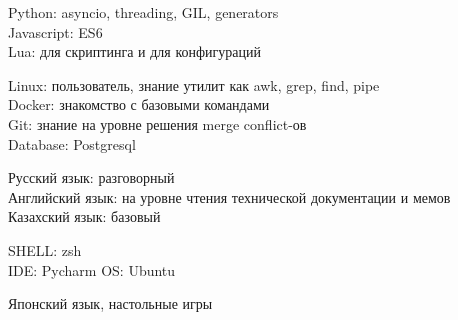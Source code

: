\documentclass[10pt]{article} %
\begin{document}
{
  Python: asyncio, threading, GIL, generators\\
  Javascript: ES6\\
  Lua: для скриптинга и для конфигураций
}

{
  Linux: пользователь, знание утилит как awk, grep, find, pipe\\
  Docker: знакомство с базовыми командами\\
  Git: знание на уровне решения merge conflict-ов\\
  Database: Postgresql
}

{
  Русский язык: разговорный\\
  Английский язык: на уровне чтения технической документации и мемов\\
  Казахский язык: базовый
}


{
  SHELL: zsh\\
  IDE: Pycharm
  OS: Ubuntu
}

{
  Японский язык, настольные игры
}
\end{document}
